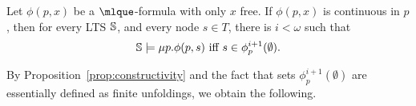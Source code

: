 \begin{proposition}\label{prop:constructivity}
Let $\phi(p,x)$ be a $\mlque$-formula with only $x$ free. If $\phi(p,x)$ is continuous in $p$, then for every LTS $\mathbb{S}$, and every node $s \in T$, there is $i < \omega$ such that
\[\model \models \mu p. \phi(p,s) \text{ iff } s \in \phi_p^{i+1}(\emptyset).\]
\end{proposition}

By Proposition~\ref{prop:constructivity} and the fact that sets $\phi_p^{i+1}(\emptyset)$ are essentially defined as finite unfoldings, we obtain the following.%

